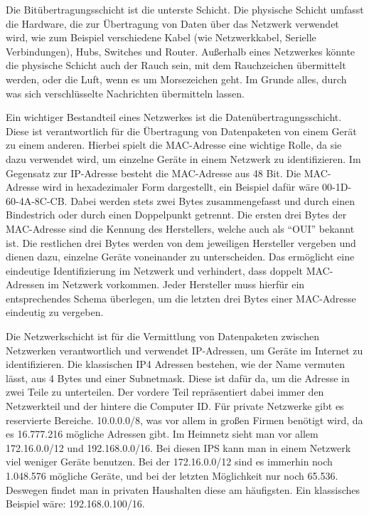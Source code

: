 \begin{compactenum} 
    \item Die Bitübertragungsschicht ist die unterste Schicht. Die physische Schicht umfasst die Hardware, die zur Übertragung von Daten über das Netzwerk verwendet wird, wie zum Beispiel verschiedene Kabel (wie Netzwerkkabel, Serielle Verbindungen), Hubs, Switches und Router. Außerhalb eines Netzwerkes könnte die physische Schicht auch der Rauch sein, mit dem Rauchzeichen übermittelt werden, oder die Luft, wenn es um Morsezeichen geht. Im Grunde alles, durch was sich verschlüsselte Nachrichten übermitteln lassen.  
    \item Ein wichtiger Bestandteil eines Netzwerkes ist die Datenübertragungsschicht. Diese ist verantwortlich für die Übertragung von Datenpaketen von einem Gerät zu einem anderen. Hierbei spielt die MAC-Adresse eine wichtige Rolle, da sie dazu verwendet wird, um einzelne Geräte in einem Netzwerk zu identifizieren. Im Gegensatz zur IP-Adresse besteht die MAC-Adresse aus 48 Bit. Die MAC-Adresse wird in hexadezimaler Form dargestellt, ein Beispiel dafür wäre 00-1D-60-4A-8C-CB. Dabei werden stets zwei Bytes zusammengefasst und durch einen Bindestrich oder durch einen Doppelpunkt getrennt. Die ersten drei Bytes der MAC-Adresse sind die Kennung des Herstellers, welche auch als “OUI” bekannt ist. Die restlichen drei Bytes werden von dem jeweiligen Hersteller vergeben und dienen dazu, einzelne Geräte voneinander zu unterscheiden. Das ermöglicht eine eindeutige Identifizierung im Netzwerk und verhindert, dass doppelt MAC-Adressen im Netzwerk vorkommen. Jeder Hersteller muss hierfür ein entsprechendes Schema überlegen, um die letzten drei Bytes einer MAC-Adresse eindeutig zu vergeben.     \cite{wieisteineMacaufgebaut}
    \item Die Netzwerkschicht ist für die Vermittlung von Datenpaketen zwischen Netzwerken verantwortlich und verwendet IP-Adressen, um Geräte im Internet zu identifizieren. \cite{ipAddress} Die klassischen IP4 Adressen bestehen, wie der Name vermuten lässt, aus 4 Bytes und einer Subnetmask. Diese ist dafür da, um die Adresse in zwei Teile zu unterteilen. Der vordere Teil repräsentiert dabei immer den Netzwerkteil und der hintere die Computer ID. Für private Netzwerke gibt es reservierte Bereiche. 10.0.0.0/8, was vor allem in großen Firmen benötigt wird, da es 16.777.216 mögliche Adressen gibt. Im Heimnetz sieht man vor allem 172.16.0.0/12 und 192.168.0.0/16. Bei diesen IPS kann man in einem Netzwerk viel weniger Geräte benutzen. Bei der 172.16.0.0/12 sind es immerhin noch 1.048.576 mögliche Geräte, und bei der letzten Möglichkeit nur noch 65.536. Deswegen findet man in privaten Haushalten diese am häufigsten. Ein klassisches Beispiel wäre: 192.168.0.100/16.   

\end{compactenum}
